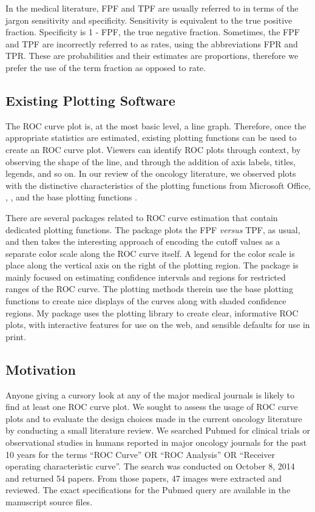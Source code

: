 \documentclass[article]{jss}
\begin{document}
In the medical literature, FPF and TPF are usually referred to in terms
of the jargon sensitivity and specificity. Sensitivity is equivalent to
the true positive fraction. Specificity is 1 - FPF, the true negative
fraction. Sometimes, the FPF and TPF are incorrectly referred to as
rates, using the abbreviations FPR and TPR. These are probabilities and
their estimates are proportions, therefore we prefer the use of the term
fraction as opposed to rate.

\subsection{Existing Plotting
Software}\label{existing-plotting-software}

The ROC curve plot is, at the most basic level, a line graph. Therefore,
once the appropriate statistics are estimated, existing plotting
functions can be used to create an ROC curve plot. Viewers can identify
ROC plots through context, by observing the shape of the line, and
through the addition of axis labels, titles, legends, and so on. In our
review of the oncology literature, we observed plots with the
distinctive characteristics of the plotting functions from Microsoft
Office, , , and the base 
plotting functions \citep{arr}.

There are several  packages related to ROC curve estimation
that contain dedicated plotting functions. The  package
\citep{rocr} plots the FPF \emph{versus} TPF, as usual, and then takes
the interesting approach of encoding the cutoff values as a separate
color scale along the ROC curve itself. A legend for the color scale is
place along the vertical axis on the right of the plotting region. The
 package \citep{pROC} is mainly focused on estimating
confidence intervals and regions for restricted ranges of the ROC curve.
The plotting methods therein use the base  plotting
functions to create nice displays of the curves along with shaded
confidence regions. My  package uses the 
\citep{ggplot2} plotting library to create clear, informative ROC plots,
with interactive features for use on the web, and sensible defaults for
use in print.

\subsection{Motivation}\label{motivation}

Anyone giving a cursory look at any of the major medical journals is
likely to find at least one ROC curve plot. We sought to assess the
usage of ROC curve plots and to evaluate the design choices made in the
current oncology literature by conducting a small literature review. We
searched Pubmed for clinical trials or observational studies in humans
reported in major oncology journals for the past 10 years for the terms
``ROC Curve'' OR ``ROC Analysis'' OR ``Receiver operating characteristic
curve''. The search was conducted on October 8, 2014 and returned 54
papers. From those papers, 47 images were extracted and reviewed. The
exact specifications for the Pubmed query are available in the
manuscript source files.
\end{document}

